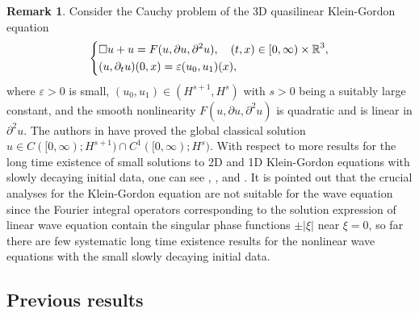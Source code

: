 \documentclass[11pt,twoside]{article}
\def\R{\mathop{\mathbb R\kern 0pt}\nolimits}
\def\p{\partial}
\def\ve{\varepsilon}
\theoremstyle{plain}
\theoremstyle{definition}
\theoremstyle{assumption}
\newtheorem{remark}{Remark}[section]
\numberwithin{equation}{section}
\begin{document}
\begin{remark}\label{rmk:1.4-1}
Consider the Cauchy problem of the 3D quasilinear Klein-Gordon equation
\begin{equation*}\label{KG-01}
\left\{
\begin{aligned}
&\Box u+u=F(u,\p u,\p^2u),\quad(t,x)\in[0,\infty)\times\R^3,\\
&(u,\p_tu)(0,x)=\ve(u_0,u_1)(x),
\end{aligned}
\right.
\end{equation*}
where $\ve>0$ is small, $(u_0,u_1)\in (H^{s+1}, H^s)$ with $s>0$ being a suitably large constant,
and the smooth nonlinearity $F(u,\p u,\p^2u)$ is quadratic
and is linear in $\p^2u$. The authors in  \cite{HouYin2} have proved the global classical solution $u\in C([0,\infty); H^{s+1})\cap  C^1([0,\infty);H^{s})$.
With respect to more results for the long time existence of small solutions to 2D and 1D Klein-Gordon equations with slowly decaying
initial data, one can see \cite{Delort97}, \cite{DelortFang}, \cite{HouTaoYin} and \cite{Stingo18}.
It is pointed out that the crucial analyses for the Klein-Gordon equation are not suitable for
the wave equation since the Fourier integral
operators corresponding to the solution expression of linear wave equation contain the singular phase functions $\pm|\xi|$ near $\xi=0$,
so far there are few systematic long time existence results for the nonlinear wave equations with the small
slowly decaying initial data.
\end{remark}





	
	
	\subsection{Previous results}
	
\end{document}
